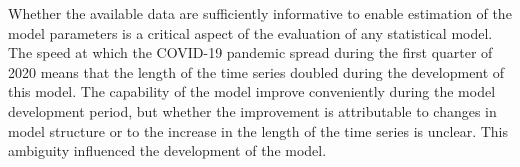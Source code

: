 \documentclass[12pt,letterpaper]{article}
\begin{document}
Whether the available data are sufficiently informative to enable
estimation of the model parameters is a critical aspect of the
evaluation of any statistical model.
The speed at which the COVID-19 pandemic spread during the first
quarter of
2020 means that the length of the time series doubled during
the development of this model. The capability of the
model improve conveniently during the model development period,
but whether the improvement is
attributable to changes in model structure or to the increase in the
length of the time series is unclear. This ambiguity influenced the
development of the model.

\cite{Sibert2017,Nielsen2014b,Chen2020}

\clearpage
\printbibliography[title=References]
\end{document}
